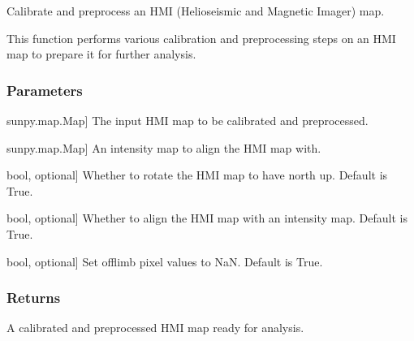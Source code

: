 \documentclass[letterpaper,10pt,english]{sphinxmanual}
\begin{document}
\begin{fulllineitems}
\label{\detokenize{pycatch/utils/calibration:pycatch.utils.calibration.calibrate_hmi}}
\pysigstartsignatures
{}
\pysigstopsignatures
\sphinxAtStartPar
Calibrate and preprocess an HMI (Helioseismic and Magnetic Imager) map.

\sphinxAtStartPar
This function performs various calibration and preprocessing steps on an HMI map to prepare it for further analysis.


\subsubsection{Parameters}
\label{\detokenize{pycatch/utils/calibration:id3}}\begin{description}
\sphinxlineitem{map}{[}sunpy.map.Map{]}
\sphinxAtStartPar
The input HMI map to be calibrated and preprocessed.

\sphinxlineitem{intensity\_map}{[}sunpy.map.Map{]}
\sphinxAtStartPar
An intensity map to align the HMI map with.

\sphinxlineitem{rotate}{[}bool, optional{]}
\sphinxAtStartPar
Whether to rotate the HMI map to have north up. Default is True.

\sphinxlineitem{align}{[}bool, optional{]}
\sphinxAtStartPar
Whether to align the HMI map with an intensity map. Default is True.

\sphinxlineitem{cut\_limb}{[}bool, optional{]}
\sphinxAtStartPar
Set off\sphinxhyphen{}limb pixel values to NaN. Default is True.

\end{description}


\subsubsection{Returns}
\label{\detokenize{pycatch/utils/calibration:id4}}\begin{description}
\sphinxAtStartPar
A calibrated and preprocessed HMI map ready for analysis.

\end{description}

\end{fulllineitems}
\end{document}
